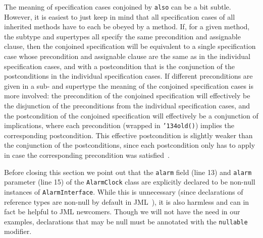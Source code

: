 \documentclass{llncs}
\def\old{\texttt{\char'134old}}
\begin{document}
The meaning of specification cases conjoined by \texttt{also} can be a
bit subtle.  However, it is easiest to just keep in mind that all
specification cases of all inherited methods have to each be obeyed by
a method.  
If, for a given method,
the subtype and supertypes all specify the same precondition and
assignable clause, then
the conjoined specification will be equivalent to a single 
specification case whose precondition and assignable clause are the
same as in the individual specification cases, and with a
postcondition that is the conjunction of the postconditions in the
individual specification cases.
If different preconditions are given in a sub- and supertype the
meaning of the conjoined specification cases is more involved:
the precondition of the conjoined specification will effectively be the
disjunction of the preconditions from the individual specification
cases, and the postcondition of the conjoined specification will
effectively be a conjunction of implications, where each precondition
(wrapped in \texttt{\old()}) implies the corresponding postcondition.
This effective postcondition is slightly weaker than the conjunction
of the postconditions, since each 
postcondition only has to apply in case the corresponding precondition
was satisfied~\cite{Dhara-Leavens96}.

Before closing this section we point out that the \texttt{alarm} field (line
13) and \texttt{alarm} parameter (line 15) of the \texttt{AlarmClock} class
are explicitly declared to be non-null instances of \texttt{AlarmInterface}.
While this is unnecessary (since declarations of reference types are non-null
by default in JML~\cite{Leavens-etal05,Chalin-FTfJP06}), it is also harmless
and can in fact be helpful to JML newcomers. Though we will not have the need
in our examples, declarations that may be null must be annotated with the
\texttt{nullable} modifier.

%
% 

\end{document}
